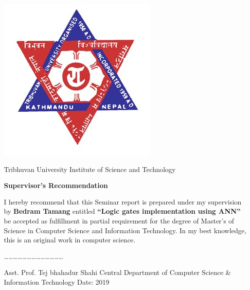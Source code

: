 
\begin{center}
\includegraphics[scale=0.5]{resources/logo.jpg}
\end{center}

\begin{center}
Tribhuvan University
\linebreak
Institute of Science and Technology 
\end{center}


\begin{center}
\vspace{2cm}
\textbf{
Supervisor’s Recommendation
}
\end{center}

\vspace{2cm}
I hereby recommend that this Seminar report is prepared under my supervision by \textbf{Bedram Tamang} entitled \textbf{“Logic gates implementation using ANN”} be accepted as fulfillment in partial requirement for the degree of Master's of Science in Computer Science and Information Technology. In my best knowledge, this is an original work in computer science.

\vspace{3cm}
\begin{flushleft}
…………………………………

Asst. Prof. Tej bhahadur Shahi \newline
Central Department of Computer Science  \newline
\& Information Technology \newline
Date: 2019
\end{flushleft}
\clearpage
